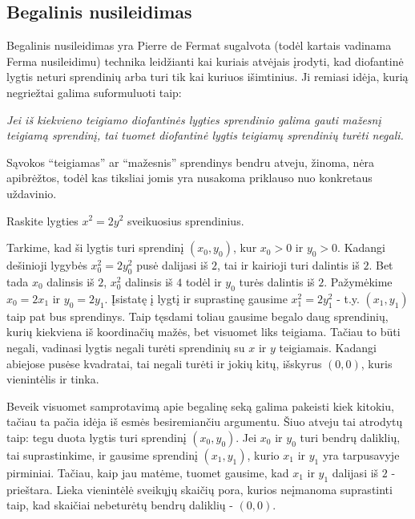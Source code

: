 \subsection{Begalinis nusileidimas}

Begalinis nusileidimas yra Pierre de Fermat sugalvota (todėl kartais vadinama Ferma
nusileidimu) technika leidžianti kai kuriais atvėjais įrodyti, kad
diofantinė lygtis neturi sprendinių arba turi tik kai kuriuos išimtinius.
Ji remiasi idėja, kurią negriežtai galima suformuluoti taip:

\begin{center}
  \emph{
    Jei iš kiekvieno teigiamo diofantinės lygties sprendinio galima gauti
    mažesnį teigiamą sprendinį, tai tuomet diofantinė lygtis teigiamų
    sprendinių turėti negali.}
\end{center}

Sąvokos ``teigiamas'' ar ``mažesnis'' sprendinys bendru atveju, žinoma,
nėra apibrėžtos, todėl kas tiksliai jomis yra nusakoma priklauso nuo
konkretaus uždavinio.  

\begin{pav} Raskite lygties $x^2 = 2y^2$ sveikuosius sprendinius.
\end{pav}

\begin{sprendimas}
  Tarkime, kad ši lygtis turi sprendinį $(x_0,y_0)$, kur $x_0>0$ ir
  $y_0>0$. Kadangi dešinioji lygybės $x_0^2 = 2y_0^2$ pusė dalijasi iš $2$,
  tai ir kairioji turi dalintis iš $2$. Bet tada $x_0$ dalinsis iš $2$,
  $x_0^2$ dalinsis iš $4$ todėl ir $y_0$ turės dalintis iš $2$. Pažymėkime
  $x_0=2x_1$ ir $y_0=2y_1$. Įsistatę į lygtį ir suprastinę gausime $x_1^2 =
  2y_1^2$ - t.y. $(x_1, y_1)$ taip pat bus sprendinys. Taip tęsdami toliau
  gausime begalo daug sprendinių, kurių kiekviena iš koordinačių mažės, bet
  visuomet liks teigiama. Tačiau to būti negali, vadinasi lygtis negali
  turėti sprendinių su $x$ ir $y$ teigiamais. Kadangi abiejose pusėse
  kvadratai, tai negali turėti ir jokių kitų, išskyrus $(0,0)$, kuris
  vienintėlis ir tinka.

  Beveik visuomet samprotavimą apie begalinę seką galima pakeisti kiek
  kitokiu, tačiau ta pačia idėja iš esmės besiremiančiu argumentu. Šiuo
  atveju tai atrodytų taip: tegu duota lygtis turi sprendinį $(x_0, y_0)$.
  Jei $x_0$ ir $y_0$ turi bendrų daliklių, tai suprastinkime, ir gausime
  sprendinį $(x_1,y_1)$, kurio $x_1$ ir $y_1$ yra tarpusavyje pirminiai.
  Tačiau, kaip jau matėme, tuomet gausime, kad $x_1$ ir $y_1$ dalijasi iš
  $2$ - prieštara. Lieka vienintėlė sveikųjų skaičių pora, kurios neįmanoma
  suprastinti taip, kad skaičiai nebeturėtų bendrų daliklių - $(0,0)$.
\end{sprendimas}

